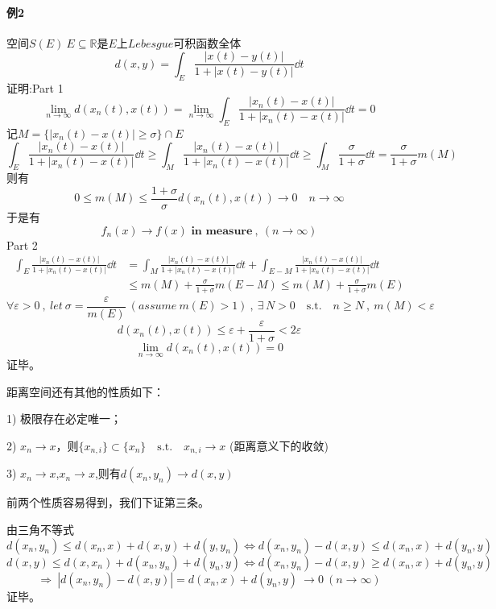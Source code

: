 \paragraph*{例2} \quad 空间$S(E) \ E \subseteq \mathbb{R}$是$E$上$Lebesgue$可积函数全体
\[d(x,y)=\int_E\frac{\left|x(t)-y(t)\right|}{1+\left|x(t)-y(t)\right|}\dd t\]
证明:Part 1
\[\lim_{n \rightarrow \infty}d(x_n(t),x(t))=\lim_{n \rightarrow \infty}\int_E\frac{\left|x_n(t)-x(t)\right|}{1+\left|x_n(t)-x(t)\right|}\dd t=0\]
记$M=\{|x_n(t)-x(t)| \geq \sigma\}\cap E$
\[\int_E\frac{\left|x_n(t)-x(t)\right|}{1+\left|x_n(t)-x(t)\right|}\dd t \geq \int_M\frac{\left|x_n(t)-x(t)\right|}{1+\left|x_n(t)-x(t)\right|}\dd t \geq \int_M\frac{\sigma}{1+\sigma}\dd t=\frac{\sigma}{1+\sigma}m(M)\]
则有
\[0 \leq m(M) \leq \frac{1+\sigma}{\sigma}d(x_n(t),x(t))\rightarrow 0 \quad n \rightarrow \infty\]
于是有
\[f_n(x) \rightarrow f(x)\textbf{ in measure} \ , \ (n \rightarrow \infty)\]
Part 2
\begin{equation*}
    \begin{aligned}
        \int_E\frac{\left|x_n(t)-x(t)\right|}{1+\left|x_n(t)-x(t)\right|}\dd t & =\int_M\frac{\left|x_n(t)-x(t)\right|}{1+\left|x_n(t)-x(t)\right|}\dd t+\int_{E-M}\frac{\left|x_n(t)-x(t)\right|}{1+\left|x_n(t)-x(t)\right|}\dd t \\
        & \leq m(M)+\frac{\sigma}{1+\sigma}m(E-M) \leq m(M)+\frac{\sigma}{1+\sigma}m(E)
    \end{aligned}
\end{equation*}
\[\forall \varepsilon>0 \ , \ let \ \sigma=\frac{\varepsilon}{m(E)} \ (assume \ m(E)>1) \ , \ \exists \, N>0 \quad \text{s.t.} \quad n \geq N \ , \ m(M)<\varepsilon\]
\[d(x_n(t),x(t)) \leq \varepsilon+\frac{\varepsilon}{1+\sigma}<2\varepsilon\]
\[\lim_{n \rightarrow \infty}d(x_n(t),x(t))=0\]
证毕。

距离空间还有其他的性质如下：

1) 极限存在必定唯一；

2) $x_n \rightarrow x$，则$\{x_{n,i}\} \subset \{x_n\} \quad \text{s.t.} \quad x_{n,i} \rightarrow x$ (距离意义下的收敛)

3) $x_n \rightarrow x$,$x_n \rightarrow x$,则有$d(x_n,y_n) \rightarrow d(x,y)$

前两个性质容易得到，我们下证第三条。

由三角不等式
\[d(x_n,y_n) \leq d(x_n,x)+d(x,y)+d(y,y_n) \Leftrightarrow d(x_n,y_n)-d(x,y) \leq d(x_n,x)+d(y_n,y)\]
\[d(x,y) \leq d(x,x_n)+d(x_n,y_n)+d(y_n,y) \Leftrightarrow d(x_n,y_n)-d(x,y) \geq d(x_n,x)+d(y_n,y)\]
\[\Rightarrow \ |d(x_n,y_n)-d(x,y)|=d(x_n,x)+d(y_n,y) \ \rightarrow 0 \ (n \rightarrow \infty)\]
证毕。

